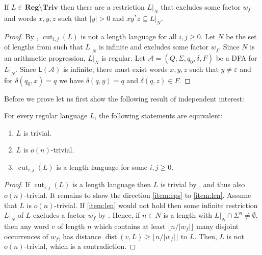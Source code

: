 \documentclass{theoretics}
\newcommand{\A}{\mathcal{A}}
\renewcommand{\L}{\mathsf{L}}
\DeclareMathOperator{\dist}{dist}
\DeclareMathOperator{\cut}{cut}
\newcommand{\Reg}{\mathbf{Reg}}
\newcommand{\Triv}{\mathbf{Triv}}
\renewcommand{\geq}{\geqslant}
\renewcommand{\ge}{\geq}
\begin{document}
\begin{lemma} \label{lemma-reg-nontriv}
If $L \in \Reg \setminus \Triv$ then there 
are a restriction $L|_N$ that excludes some factor $w_f$ and words $x,y,z$ such that $|y|>0$ and 
$x y^* z \subseteq L|_N$.
\end{lemma}

\begin{proof}
By , $\cut_{i,j}(L)$ is not a length language for all $i, j \ge 0$.
Let $N$ be the set of lengths from 
such that $L|_N$ is infinite and excludes some factor $w_f$. 
Since $N$ is an arithmetic progression, $L|_N$ is regular. 
Let $\A = (Q,\Sigma,q_0,\delta,F)$ be a DFA for $L|_N$.
Since $\L(\A)$ is infinite, there must exist words $x,y,z$ such that $y \neq \varepsilon$ and 
for $\delta(q_0,x) = q$ we have $\delta(q, y) = q$ and $\delta(q,z) \in F$.
\end{proof}
Before we prove  let us first show the following result of independent interest:

\begin{theorem} 
	\label{triv-alon}
	For every regular language $L$, the following statements are equivalent:
	\begin{enumerate}[label=(\roman{*}), ref=(\roman{*})]
		\item $L$ is trivial.
		\item $L$ is $o(n)$-trivial. \label{item:eps}
		\item $\cut_{i,j}(L)$ is a length language for some $i, j \ge 0$. \label{item:len}
	\end{enumerate}
\end{theorem}


\begin{proof}
	If $\cut_{i,j}(L)$ is a length language then $L$ is trivial by ,
	and thus also $o(n)$-trivial. 
	It remains to show the direction \ref{item:eps} to \ref{item:len}.
	Assume that $L$ is $o(n)$-trivial.
	If \ref{item:len} would not hold then
	some infinite restriction $L|_N$ of $L$ excludes a factor $w_f$ by .
	Hence, if $n \in N$ is a length with $L|_N \cap \Sigma^n \neq \emptyset$,
	then any word $v$ of length $n$
	which contains at least $\lfloor n/|w_f| \rfloor$
	many disjoint occurrences of $w_f$, has distance $\dist(v,L) \ge \lfloor n/|w_f| \rfloor$ to $L$.
	Then, $L$ is not $o(n)$-trivial, which is a contradiction.
\end{proof}
\end{document}
